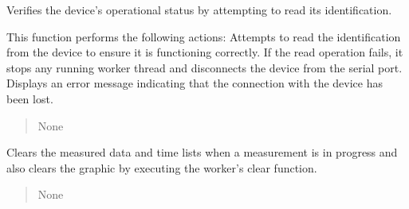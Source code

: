 \documentclass[letterpaper,10pt,english]{sphinxmanual}
\begin{document}
\begin{fulllineitems}

\begin{fulllineitems}
\label{\detokenize{FLIMGraphics:FLIMGraphics.FLIMGraphic.checkDeviceStatus}}
\pysigstartsignatures
{}
\pysigstopsignatures
\sphinxAtStartPar
Verifies the device’s operational status by attempting to read its identification.

\sphinxAtStartPar
This function performs the following actions:
\sphinxhyphen{} Attempts to read the identification from the device to ensure it is functioning correctly.
\sphinxhyphen{} If the read operation fails, it stops any running worker thread and disconnects the device from the serial port.
\sphinxhyphen{} Displays an error message indicating that the connection with the device has been lost.
\begin{quote}\begin{description}
\sphinxAtStartPar
None

\end{description}\end{quote}

\end{fulllineitems}


\begin{fulllineitems}
\label{\detokenize{FLIMGraphics:FLIMGraphics.FLIMGraphic.clearGraphic}}
\pysigstartsignatures
{}
\pysigstopsignatures
\sphinxAtStartPar
Clears the measured data and time lists when a measurement is in progress 
and also clears the graphic by executing the worker’s clear function.
\begin{quote}\begin{description}
\sphinxAtStartPar
None

\end{description}\end{quote}

\end{fulllineitems}



\end{fulllineitems}
\end{document}
